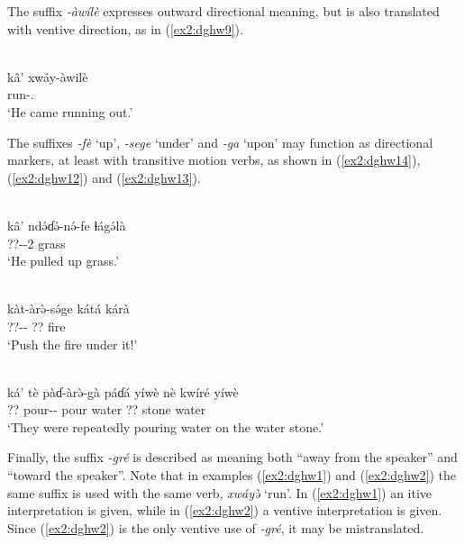 The suffix \textit{-àwílè} expresses outward directional meaning, but is also translated with ventive direction, as in (\ref{ex2:dghw9}).

\ea\label{ex2:dghw9}
 \\
\gll kâ' xwáy-àwilè	\\
 run-. \\
\glt `He came running out.'
\z 

The suffixes \textit{-fè} `up', \textit{-sege} `under' and \textit{-ga} `upon' may function as directional markers, at least with transitive motion verbs, as shown in (\ref{ex2:dghw14}), (\ref{ex2:dghw12}) and (\ref{ex2:dghw13}). 

\ea\label{ex2:dghw14}
 \\
\gll kâ' ndə́ɗə́-nə́-fe ɬágə́là	\\
 ??--2 grass \\
\glt `He pulled up grass.'

\ex\label{ex2:dghw12}
 \\
\gll kàt-àrə̀-sə́ge kátá kárà	\\
??-- ?? fire	 \\
\glt `Push the fire under it!'

\ex\label{ex2:dghw13}
 \\
\gll ká' tè pàɗ-àrə̀-gà páɗá yíwè nè kwíré yíwè \\
 ?? pour-- pour water ?? stone water	\\
\glt `They were repeatedly pouring water on the water stone.'
\z 

Finally, the suffix \textit{-gré} is described as meaning both ``away from the speaker'' and ``toward the speaker''. Note that in examples (\ref{ex2:dghw1}) and (\ref{ex2:dghw2}) the same suffix is used with the same verb, \textit{xwáyə̀} `run'. In (\ref{ex2:dghw1}) an itive interpretation is given, while in (\ref{ex2:dghw2}) a ventive interpretation is given. Since (\ref{ex2:dghw2}) is the only ventive use of \textit{-gré}, it may be mistranslated. 

